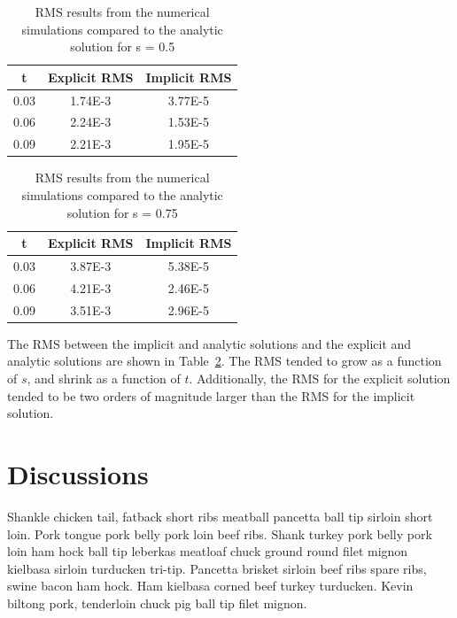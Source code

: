 \documentclass[twocolumn,10pt]{asme2ej}
\begin{document}
\begin{table}[h]
\begin{center}
\label{table_ASME}
\begin{tabular}{|c | c c|}
\hline
t & Explicit RMS & Implicit RMS \\
\hline
0.03 & 1.74E-3 & 3.77E-5\\
0.06 & 2.24E-3 & 1.53E-5\\
0.09 & 2.21E-3 & 1.95E-5\\
\hline
\end{tabular}
\caption{RMS results from the numerical simulations compared to the analytic solution for s = 0.5}
\end{center}
\end{table}

\begin{table}[h]
\begin{center}
\label{table_ASME}
\begin{tabular}{|c | c c|}
\hline
t & Explicit RMS & Implicit RMS \\
\hline
0.03 & 3.87E-3 & 5.38E-5 \\
0.06 & 4.21E-3 & 2.46E-5\\
0.09 & 3.51E-3 & 2.96E-5 \\
\hline
\end{tabular}
\caption{RMS results from the numerical simulations compared to the analytic solution for s = 0.75}
\end{center}
\end{table}


The RMS between the implicit and analytic solutions and the explicit and analytic solutions are shown in Table~\ref{table_ASME}. The RMS tended to grow as a function of $s$, and shrink as a function of $t$. Additionally, the RMS for the explicit solution tended to be two orders of magnitude larger than the RMS for the implicit solution.

\section{Discussions}
Shankle chicken tail, fatback short ribs meatball pancetta ball tip sirloin short loin. Pork tongue pork belly pork loin beef ribs. Shank turkey pork belly pork loin ham hock ball tip leberkas meatloaf chuck ground round filet mignon kielbasa sirloin turducken tri-tip. Pancetta brisket sirloin beef ribs spare ribs, swine bacon ham hock. Ham kielbasa corned beef turkey turducken. Kevin biltong pork, tenderloin chuck pig ball tip filet mignon.
\end{document}
